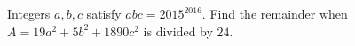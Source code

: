 Integers $a,b,c$ satisfy $abc=2015^{2016}$. Find the remainder when $A=19a^2+5b^2+1890c^2$ is divided by $24$.
